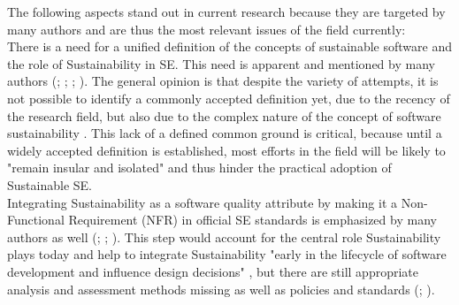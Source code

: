 \documentclass[oribibl]{llncs}
\begin{document}
The following aspects stand out in current research because they are targeted by many authors and are thus the most relevant issues of the field currently:\\
There is a need for a unified definition of the concepts of sustainable software and the role of Sustainability in SE. This need is apparent and mentioned by many authors (\cite{venters_software_2014}; \cite{becker_sustainability_2015}; \cite{calero_green_2015}; \cite{penzenstadler_what_13}). The general opinion is that despite the variety of attempts, it is not possible to identify a commonly accepted definition yet, due to the recency of the research field, but also due to the complex nature of the concept of software sustainability \cite{venters_software_2014}. %
This lack of a defined common ground is critical, because until a widely accepted definition is established, most efforts in the field will be likely to "remain insular and isolated" \cite[p.\,5]{venters_software_2014} and thus hinder the practical adoption of Sustainable SE.\\
Integrating Sustainability as a software quality attribute by making it a Non-Functional Requirement (NFR) in official SE standards is emphasized by many authors as well (\cite{penzenstadler_safety_2014}; \cite{amsel_toward_2011}; \cite{agarwal_sustainable_2012}). This step would account for the central role Sustainability plays today \cite{penzenstadler_safety_2014} and help to integrate Sustainability "early in the lifecycle of software development and influence design decisions" \cite[p.\,2]{raturi_developing_2014}, but there are still appropriate analysis and assessment methods missing as well as policies and standards (\cite{penzenstadler_safety_2014}; \cite{venters_software_2014}).\\ %
\end{document}
